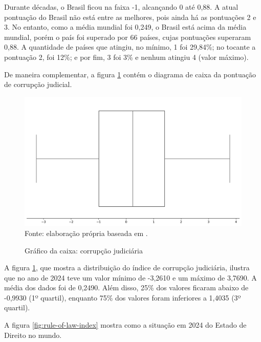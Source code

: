 Durante décadas, o Brasil ficou na faixa -1, alcançando 0 até 0,88. A atual pontuação do Brasil não está entre as melhores, pois ainda há as pontuações 2 e 3. No entanto, como a média mundial foi 0,249, o Brasil está acima da média mundial, porém o país foi superado por 66 países, cujas pontuações superaram 0,88. A quantidade de países que atingiu, no mínimo, 1 foi 29,84\%; no tocante a pontuação 2, foi 12\%; e por fim, 3 foi 3\% e nenhum atingiu 4 (valor máximo).

De maneira complementar, a figura \ref{fig:quartis_corrupcao_judiciaria} contém o diagrama de caixa da pontuação de corrupção judicial.

\begin{figure}[H]
    \centering
    \caption{Gráfico da caixa: corrupção judiciária}
    \includegraphics[width=1\linewidth]{figuras/quartis_corrupcao_judiciaria.png}
    \label{fig:quartis_corrupcao_judiciaria}
    \footnotesize{Fonte: elaboração própria baseada em \cite{judicial-corruption-score}.}
\end{figure}

A figura \ref{fig:quartis_corrupcao_judiciaria}, que mostra a distribuição do índice de corrupção judiciária, ilustra que no ano de 2024 teve um valor mínimo de -3,2610 e um máximo de 3,7690. A média dos dados foi de 0,2490. Além disso, 25\% dos valores ficaram abaixo de -0,9930 (1º quartil), enquanto 75\% dos valores foram inferiores a 1,4035 (3º quartil).

A figura \ref{fig:rule-of-law-index} mostra como a situação em 2024 do Estado de Direito no mundo.


